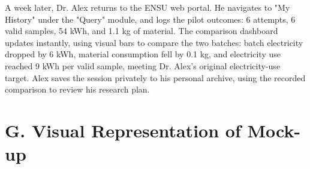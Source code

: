 \documentclass[11pt,a4paper]{article}
\begin{document}
A week later, Dr. Alex returns to the ENSU web portal. He navigates to "My History" under the "Query" module, and logs the pilot outcomes: 6 attempts, 6 valid samples, 54 kWh, and 1.1 kg of material. The comparison dashboard updates instantly, using visual bars to compare the two batches: batch electricity dropped by 6 kWh, material consumption fell by 0.1 kg, and electricity use reached 9 kWh per valid sample, meeting Dr. Alex's original electricity-use target. Alex saves the session privately to his personal archive, using the recorded comparison to review his research plan.



\clearpage
\section*{G. Visual Representation of Mock-up}
\end{document}
